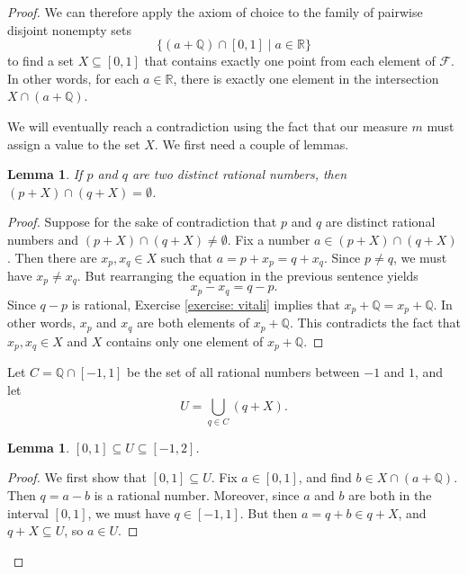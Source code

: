 \documentclass[a4paper]{memoir}
\newtheorem{lemma}[theorem]{Lemma}
\theoremstyle{definition}
\newcommand{\bb}{\mathbb}
\begin{document}
\begin{proof}
  We can therefore apply the axiom of choice to the family of pairwise disjoint nonempty sets 
  \[
    \{(a + \bb{Q}) \cap [0,1] \mid a \in \bb{R}\}
  \] 
  to find a set $X \subseteq [0,1]$ that contains exactly 
  one point from each element of $\mathcal{F}$. In other words, for each $a \in \bb{R}$, there is 
  exactly one element in the intersection $X \cap (a + \bb{Q})$.
  
  We will eventually reach a contradiction using the fact that our measure $m$ must assign a value 
  to the set $X$. We first need a couple of lemmas.
  
  \begin{lemma} \label{lemma: pairwise_disjoint}
    If $p$ and $q$ are two distinct rational numbers, then $(p + X) \cap (q + X) = \emptyset$.
  \end{lemma}
  
  \begin{proof}
    Suppose for the sake of contradiction that $p$ and $q$ are distinct rational numbers 
    and $(p + X) \cap (q + X) \neq \emptyset$. Fix a number $a \in (p + X) \cap (q + X)$. 
    Then there are $x_p, x_q \in X$ such that $a = p + x_p = q + x_q$. Since $p \neq q$, 
    we must have $x_p \neq x_q$. But rearranging the equation in the previous sentence yields 
    \[
      x_p - x_q = q - p.
    \]
    Since $q - p$ is rational, Exercise \ref{exercise: vitali} implies that $x_p + \bb{Q} = 
    x_p + \bb{Q}$. In other words, $x_p$ and $x_q$ are both elements of $x_p + \bb{Q}$. 
    This contradicts the fact that $x_p, x_q \in X$ and $X$ contains only one element of 
    $x_p + \bb{Q}$.
  \end{proof}
  
  Let $C = \bb{Q} \cap [-1,1]$ be the set of all rational numbers between $-1$ and $1$, and 
  let 
  \[
    U = \bigcup_{q \in C} (q + X).
  \]   
  
  \begin{lemma} \label{lemma: sandwich}
    $[0,1] \subseteq U \subseteq [-1,2]$.
  \end{lemma}
  
  \begin{proof}
    We first show that $[0,1] \subseteq U$. Fix $a \in [0,1]$, and find $b \in X \cap (a + \bb{Q})$. 
    Then $q = a - b$ is a rational number. Moreover, since $a$ and $b$ are both in the 
    interval $[0,1]$, we must have $q \in [-1,1]$. But then $a = q + b \in q + X$, and 
    $q + X \subseteq U$, so $a \in U$.
    

\end{proof}
\end{proof}
\end{document}
